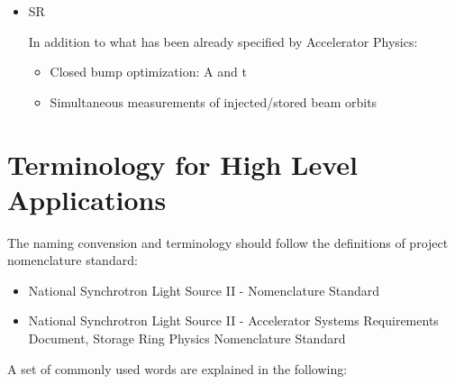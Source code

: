 \documentclass[11pt,oneside,letterpaper,showtrims,article]{memoir}
\begin{document}
\begin{itemize}
\item SR

  In addition to what has been already specified by Accelerator Physics:

\begin{itemize}
\item Closed bump optimization: A and t
\item Simultaneous measurements of injected/stored beam orbits
\end{itemize}

\end{itemize}


\section{Terminology for High Level Applications}

The naming convension and terminology should follow the definitions of
project nomenclature standard:

\begin{itemize}
\item National Synchrotron Light Source II - Nomenclature Standard~\cite{lt_2009_nomenclature}
\item National Synchrotron Light Source II - Accelerator Systems
Requirements Document, Storage Ring Physics Nomenclature Standard~\cite{lt_2008_nomenclature}
\end{itemize}

A set of commonly used words are explained in the following:
\end{document}
